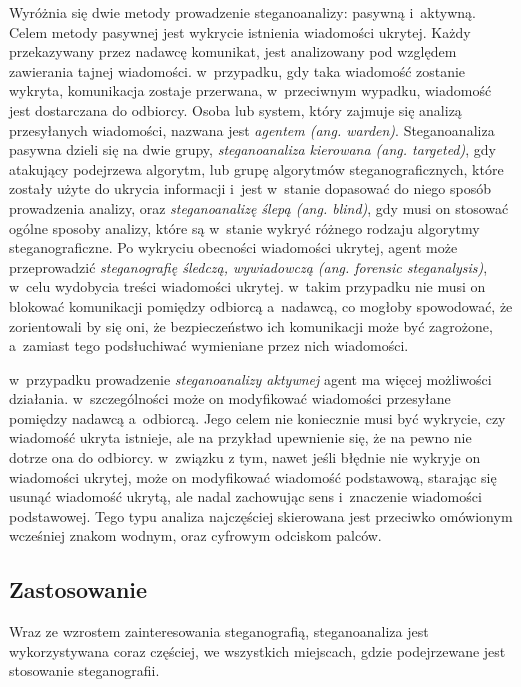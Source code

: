 \documentclass[a4paper, twoside, 12pt]{report}
\begin{document}
        Wyróżnia się dwie metody prowadzenie steganoanalizy: pasywną i~aktywną.
        Celem metody pasywnej jest wykrycie istnienia wiadomości ukrytej. Każdy przekazywany
        przez nadawcę komunikat, jest analizowany pod względem zawierania tajnej wiadomości.
        w~przypadku, gdy taka wiadomość zostanie wykryta, komunikacja zostaje przerwana,
        w~przeciwnym wypadku, wiadomość jest dostarczana do odbiorcy. Osoba lub system,
        który zajmuje się analizą przesyłanych wiadomości, nazwana jest \emph{agentem (ang. warden)}.
        Steganoanaliza pasywna dzieli się na dwie grupy, \emph{steganoanaliza kierowana (ang. targeted)}, gdy
        atakujący podejrzewa algorytm, lub grupę algorytmów steganograficznych,
        które zostały użyte do ukrycia informacji i~jest w~stanie dopasować do
        niego sposób prowadzenia analizy, oraz \emph{steganoanalizę ślepą (ang. blind)},
        gdy musi on stosować ogólne sposoby analizy, które są w~stanie wykryć różnego
        rodzaju algorytmy steganograficzne. Po wykryciu obecności wiadomości ukrytej,
        agent może przeprowadzić \emph{steganografię śledczą, wywiadowczą (ang. forensic steganalysis)},
        w~celu wydobycia treści wiadomości ukrytej. w~takim przypadku nie musi on
        blokować komunikacji pomiędzy odbiorcą a~nadawcą, co mogłoby spowodować,
        że zorientowali by się oni, że bezpieczeństwo ich komunikacji może być zagrożone,
        a~zamiast tego podsłuchiwać wymieniane przez nich wiadomości.

        w~przypadku prowadzenie \emph{steganoanalizy aktywnej} agent ma więcej możliwości
        działania. w~szczególności może on modyfikować wiadomości przesyłane pomiędzy
        nadawcą a~odbiorcą. Jego celem nie koniecznie musi być wykrycie, czy wiadomość
        ukryta istnieje, ale na przykład upewnienie się, że na pewno nie dotrze ona
        do odbiorcy. w~związku z tym, nawet jeśli błędnie nie wykryje on wiadomości ukrytej,
        może on modyfikować wiadomość podstawową, starając się usunąć wiadomość ukrytą,
        ale nadal zachowując sens i~znaczenie wiadomości podstawowej. Tego typu analiza
        najczęściej skierowana jest przeciwko omówionym wcześniej znakom wodnym,
        oraz cyfrowym odciskom palców.\cite[Rozdział 13]{DIGITALWATERMARKING}

        \subsection{Zastosowanie}
        Wraz ze wzrostem zainteresowania steganografią, steganoanaliza jest wykorzystywana
        coraz częściej, we wszystkich miejscach, gdzie podejrzewane jest stosowanie
        steganografii.
\end{document}
